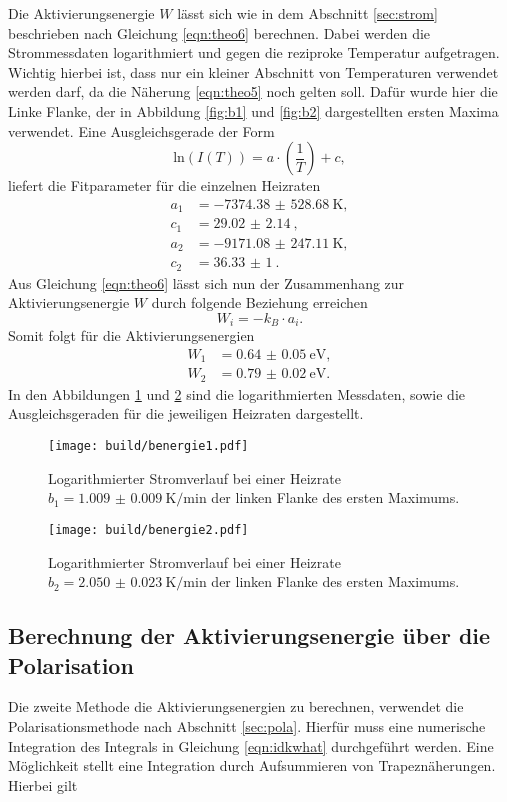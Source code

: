 Die Aktivierungsenergie $W$ lässt sich wie in dem Abschnitt \ref{sec:strom} beschrieben nach Gleichung \eqref{eqn:theo6} berechnen. Dabei werden die Strommessdaten logarithmiert und gegen 
die reziproke Temperatur aufgetragen. Wichtig hierbei ist, dass nur ein kleiner Abschnitt von Temperaturen verwendet werden darf, da
die Näherung \eqref{eqn:theo5} noch gelten soll. Dafür wurde hier die Linke Flanke, der in Abbildung \ref{fig:b1} und \ref{fig:b2} dargestellten ersten Maxima verwendet. Eine Ausgleichsgerade der Form
\begin{equation}
\text{ln}(I(T)) = a \cdot \left( \frac{1}{T}\right) + c,
\end{equation}
liefert die Fitparameter für die einzelnen Heizraten
\begin{align*}
a_1 &= \SI{-7374.38(52868)}{\kelvin},\\
c_1&= \SI{29.02(214)}{},\\
a_2 &= \SI{-9171.08(24711)}{\kelvin},\\
c_2&= \SI{36.33(100)}{}.
\end{align*}
Aus Gleichung \eqref{eqn:theo6} lässt sich nun der Zusammenhang zur Aktivierungsenergie $W$ durch folgende Beziehung erreichen
\begin{equation}
W_i = - k_B \cdot a_i.
\end{equation}
Somit folgt für die Aktivierungsenergien 
\begin{align}
W_1 &= \SI{0.64(5)}{\electronvolt},\\
W_2 &= \SI{0.79(2)}{\electronvolt}.
\end{align}
In den Abbildungen \ref{fig:a4} und \ref{fig:a5} sind die logarithmierten Messdaten, sowie die Ausgleichsgeraden für die jeweiligen Heizraten dargestellt.
\begin{figure}
    \centering
    \texttt{[image: build/benergie1.pdf]}
    \caption{Logarithmierter Stromverlauf bei einer Heizrate \newline $b_1 = \SI{1.009(9)}{\kelvin\per\minute}$ der linken Flanke des ersten Maximums.
            }
    \label{fig:a4}
\end{figure}
\begin{figure}
    \centering
    \texttt{[image: build/benergie2.pdf]}
    \caption{Logarithmierter Stromverlauf bei einer Heizrate \newline $b_2 = \SI{2.050(23)}{\kelvin\per\minute}$ der linken Flanke des ersten Maximums.
            }
    \label{fig:a5}
\end{figure}

\subsection{Berechnung der Aktivierungsenergie über die Polarisation}
Die zweite Methode die Aktivierungsenergien zu berechnen, verwendet die Polarisationsmethode nach Abschnitt \ref{sec:pola}. Hierfür muss eine numerische 
Integration des Integrals in Gleichung \eqref{eqn:idkwhat} durchgeführt werden. Eine Möglichkeit stellt eine Integration durch
Aufsummieren von Trapeznäherungen. Hierbei gilt 